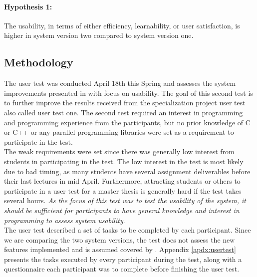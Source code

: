\paragraph*{Hypothesis 1:} The usability, in terms of either efficiency, learnability, or user satisfaction, is higher in system version two compared to system version one. \hfill \\



\subsection{Methodology}
\label{sub-sec:user-testing-methodology}
The user test was conducted April 18th this Spring and assesses the system improvements presented in  with focus on usability. The goal of this second test is to further improve the results received from the specialization project user test also called user test one. The second test required an interest in programming and programming experience from the participants, but no prior knowledge of C or C++ or any parallel programming libraries were set as a requirement to participate in the test. \\

The weak requirements were set since there was generally low interest from students in participating in the test. The low interest in the test is most likely due to bad timing, as many students have several assignment deliverables before their last lectures in mid April. Furthermore, attracting students or others to participate in a user test for a master thesis is generally hard if the test takes several hours. \textit{As the focus of this test was to test the usability of the system, it should be sufficient for participants to have general knowledge and interest in programming to assess system usability}. \\

The user test described a set of tasks to be completed by each participant. Since we are comparing the two system versions, the test does not assess the new features implemented and is assumed covered by . Appendix \ref{apdx:usertest} presents the tasks executed by every participant during the test, along with a questionnaire each participant was to complete before finishing the user test. \\

